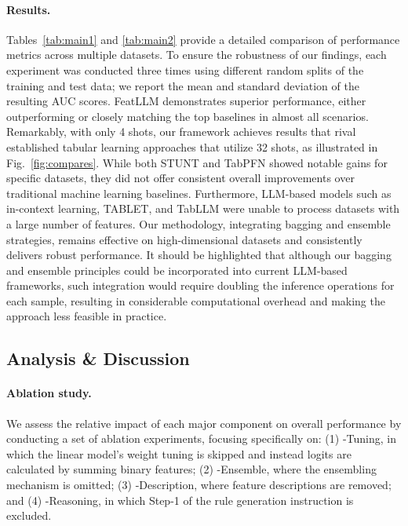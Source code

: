 \vspace*{-0.12in}
\paragraph{Results.}
Tables~\ref{tab:main1} and \ref{tab:main2} provide a detailed comparison of performance metrics across multiple datasets. To ensure the robustness of our findings, each experiment was conducted three times using different random splits of the training and test data; we report the mean and standard deviation of the resulting AUC scores. \textsf{FeatLLM} demonstrates superior performance, either outperforming or closely matching the top baselines in almost all scenarios. Remarkably, with only 4 shots, our framework achieves results that rival established tabular learning approaches that utilize 32 shots, as illustrated in Fig.~\ref{fig:compares}. While both STUNT and TabPFN showed notable gains for specific datasets, they did not offer consistent overall improvements over traditional machine learning baselines. Furthermore, LLM-based models such as in-context learning, TABLET, and TabLLM were unable to process datasets with a large number of features. Our methodology, integrating bagging and ensemble strategies, remains effective on high-dimensional datasets and consistently delivers robust performance. It should be highlighted that although our bagging and ensemble principles could be incorporated into current LLM-based frameworks, such integration would require doubling the inference operations for each sample, resulting in considerable computational overhead and making the approach less feasible in practice.

\subsection{Analysis \& Discussion}
\label{sec:analysis}
\paragraph{Ablation study.} We assess the relative impact of each major component on overall performance by conducting a set of ablation experiments, focusing specifically on: (1) \textsf{-Tuning}, in which the linear model’s weight tuning is skipped and instead logits are calculated by summing binary features; (2) \textsf{-Ensemble}, where the ensembling mechanism is omitted; (3) \textsf{-Description}, where feature descriptions are removed; and (4) \textsf{-Reasoning}, in which Step-1 of the rule generation instruction is excluded.

